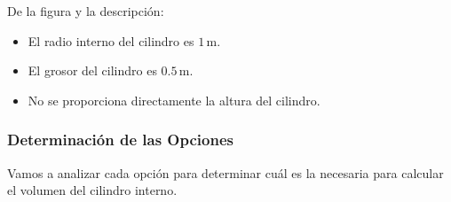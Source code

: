 \documentclass[
]{article}
\providecommand{\tightlist}{%
  \setlength{\itemsep}{0pt}\setlength{\parskip}{0pt}}
\begin{document}
De la figura y la descripción:

\begin{itemize}
\tightlist
\item
  El radio interno del cilindro es \(1 \,  \text{m}\).
\item
  El grosor del cilindro es \(0.5 \,   \text{m}\).
\item
  No se proporciona directamente la altura del cilindro.
\end{itemize}

\subsubsection{Determinación de las
Opciones}\label{determinaciuxf3n-de-las-opciones}

Vamos a analizar cada opción para determinar cuál es la necesaria para
calcular el volumen del cilindro interno.
\end{document}
